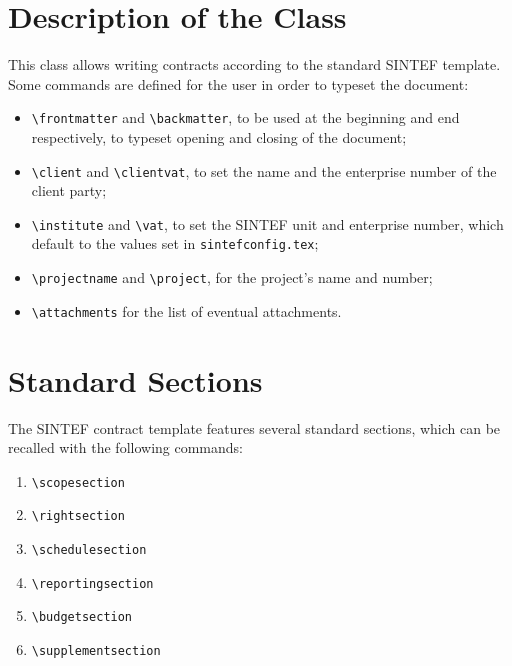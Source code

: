 \documentclass{sintefcontract}
\begin{document}
\frontmatter

\section{Description of the Class}
This class allows writing contracts according to the standard SINTEF
template.
Some commands are defined for the user in order to typeset the document:
\begin{itemize}
  \item \verb|\frontmatter| and \verb|\backmatter|, to be used at the
        beginning and end respectively, to typeset opening and closing
        of the document;
  \item \verb|\client| and \verb|\clientvat|, to set the name and the
        enterprise number of the client party;
  \item \verb|\institute| and \verb|\vat|, to set the SINTEF unit and
        enterprise number, which default to the values set in
        \texttt{sintefconfig.tex};
  \item \verb|\projectname| and \verb|\project|, for the project's
        name and number;
  \item \verb|\attachments| for the list of eventual attachments.
\end{itemize}

\section{Standard Sections}
The SINTEF contract template features several standard sections,
which can be recalled with the following commands:
\begin{enumerate}
  \item \verb|\scopesection|
  \item \verb|\rightsection|
  \item \verb|\schedulesection|
  \item \verb|\reportingsection|
  \item \verb|\budgetsection|
  \item \verb|\supplementsection|
\end{enumerate}

\backmatter
\end{document}
